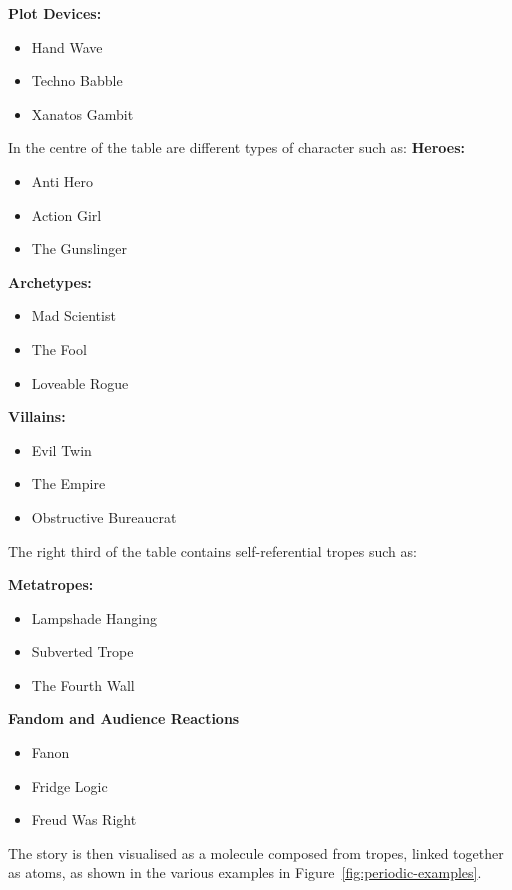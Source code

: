 \documentclass[11pt]{report}
\begin{document}
\textbf{Plot Devices:}
\begin{itemize}
  \item Hand Wave
  \item Techno Babble
  \item Xanatos Gambit
\end{itemize}

In the centre of the table are different types of character such as:
\textbf{Heroes:}
\begin{itemize}
  \item Anti Hero
  \item Action Girl
  \item The Gunslinger
\end{itemize}

\textbf{Archetypes:}
\begin{itemize}
  \item Mad Scientist
  \item The Fool
  \item Loveable Rogue
\end{itemize}

\textbf{Villains:}
\begin{itemize}
  \item Evil Twin
  \item The Empire
  \item Obstructive Bureaucrat
\end{itemize}

The right third of the table contains self-referential tropes such as:

\textbf{Metatropes:}
\begin{itemize}
  \item Lampshade Hanging
  \item Subverted Trope
  \item The Fourth Wall
\end{itemize}

\textbf{Fandom and Audience Reactions}
\begin{itemize}
  \item Fanon
  \item Fridge Logic
  \item Freud Was Right
\end{itemize}

The story is then visualised as a molecule composed from tropes, linked together as
atoms, as shown in the various examples in Figure~\ref{fig:periodic-examples}.
\end{document}
